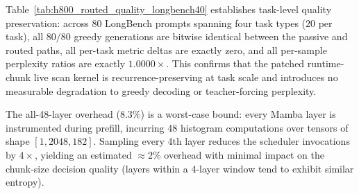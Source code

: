 \begin{table}[h]
\centering
\caption{H800 task-level routed quality check on a LongBench subset (Mamba-370M, sampled-histogram scheduler with stride~8, 8 greedy new tokens, max prompt length 1024). Four LongBench tasks are sampled at $20$~prompts each (80 total). For each task we report exact-match rate (greedy tokens identical between passive and routed paths), task-level metric mean for passive and routed, and the per-sample teacher-forcing perplexity-ratio mean. The routed path uses the patched runtime-chunk live selective-scan kernel. All 80 greedy generations are bitwise identical between passive and routed paths; all per-sample perplexity ratios are exactly $1.0000\times$.}
\label{tab:h800_routed_quality_longbench40}
\small
{}
\end{table}

Table~\ref{tab:h800_routed_quality_longbench40} establishes task-level quality preservation: across $80$ LongBench prompts spanning four task types ($20$ per task), all $80/80$ greedy generations are bitwise identical between the passive and routed paths, all per-task metric deltas are exactly zero, and all per-sample perplexity ratios are exactly $1.0000\times$. This confirms that the patched runtime-chunk live scan kernel is recurrence-preserving at task scale and introduces no measurable degradation to greedy decoding or teacher-forcing perplexity.

The all-48-layer overhead ($8.3\%$) is a worst-case bound: every Mamba layer is instrumented during prefill, incurring 48 histogram computations over tensors of shape $[1, 2048, 182]$. Sampling every 4th layer reduces the scheduler invocations by $4\times$, yielding an estimated ${\approx}2\%$ overhead with minimal impact on the chunk-size decision quality (layers within a 4-layer window tend to exhibit similar entropy).

